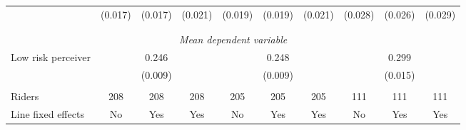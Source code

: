 \begin{tabular}{l*{9}{c}}
                    &     (0.017)         &     (0.017)         &     (0.021)         &     (0.019)         &     (0.019)         &     (0.021)         &     (0.028)         &     (0.026)         &     (0.029)         \\
\\[-1.8ex] \hline \\[-1.8ex] \multicolumn{10}{c}{\textit{Mean dependent variable}} \\ Low risk perceiver & \multicolumn{3}{c}{0.246}  & \multicolumn{3}{c}{0.248} & \multicolumn{3}{c}{0.299} \\ & \multicolumn{3}{c}{(0.009)}  & \multicolumn{3}{c}{(0.009)} & \multicolumn{3}{c}{(0.015)} \\\\[-1ex] 
Riders              &         208         &         208         &         208         &         205         &         205         &         205         &         111         &         111         &         111         \\
Line fixed effects  &          No         &         Yes         &         Yes         &          No         &         Yes         &         Yes         &          No         &         Yes         &         Yes         \\


\end{tabular}
